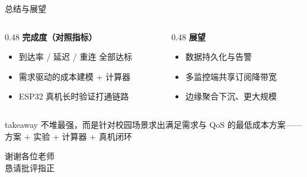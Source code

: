 \documentclass[aspectratio=169,10pt]{ctexbeamer}
\newcommand{\takeaway}[1]{%
  \vfill
  \begin{beamercolorbox}[rounded=true, center, sep=6pt]{takeaway}
    \small #1
  \end{beamercolorbox}}
\begin{document}
\begin{frame}{总结与展望}
  \vspace{6pt}
  \begin{columns}[T]
    \begin{column}{0.48\textwidth}
      \textbf{完成度（对照指标）}
      {\footnotesize
      \begin{itemize}\itemsep=4pt
        \item[$\checkmark$] 到达率 / 延迟 / 重连 全部达标
        \item[$\checkmark$] 需求驱动的成本建模 + 计算器
        \item[$\checkmark$] ESP32 真机长时验证打通链路
      \end{itemize}}
    \end{column}
    \begin{column}{0.48\textwidth}
      \textbf{展望}
      {\footnotesize
      \begin{itemize}\itemsep=4pt
        \item 数据持久化与告警
        \item 多监控端共享订阅降带宽
        \item 边缘聚合下沉、更大规模
      \end{itemize}}
    \end{column}
  \end{columns}
  \takeaway{不堆最强，而是针对校园场景求出满足需求与 QoS 的最低成本方案——方案 + 实验 + 计算器 + 真机闭环}
\end{frame}

\begin{frame}[standout]
  谢谢各位老师\\[6pt]
  {\small 恳请批评指正}
\end{frame}
\end{document}
